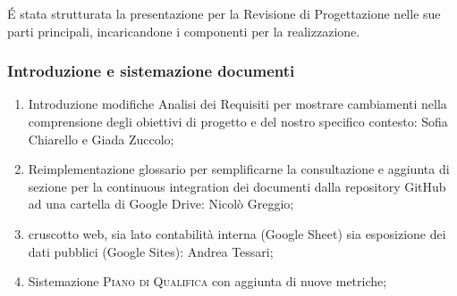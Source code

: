 \'E stata strutturata la presentazione per la Revisione di Progettazione nelle sue parti principali, incaricandone i componenti per la realizzazione.

\subsubsection{Introduzione e sistemazione documenti}
\begin{enumerate}
	\item Introduzione modifiche Analisi dei Requisiti per mostrare cambiamenti nella comprensione degli obiettivi di progetto e del nostro specifico contesto: Sofia Chiarello e Giada Zuccolo;
	\item Reimplementazione glossario per semplificarne la consultazione e aggiunta di sezione per la continuous integration dei documenti dalla repository GitHub ad una cartella di Google Drive: Nicolò Greggio;
	\item cruscotto web, sia lato contabilità interna (Google Sheet) sia esposizione dei dati pubblici (Google Sites): Andrea Tessari;
	\item Sistemazione \textsc{Piano di Qualifica} con aggiunta di nuove metriche;
	 
	
\end{enumerate}

